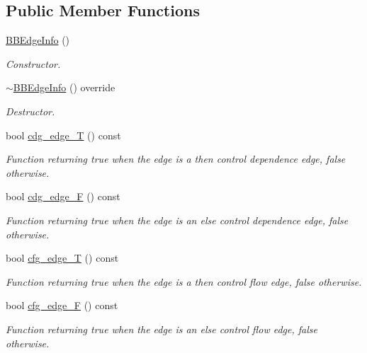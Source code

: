 \subsection*{Public Member Functions}
\begin{DoxyCompactItemize}
\item 
\hyperlink{structBBEdgeInfo_a61cfdd43ac244182cc6cfb2fa3417928}{B\+B\+Edge\+Info} ()
\begin{DoxyCompactList}\small\item\em Constructor. \end{DoxyCompactList}\item 
\hyperlink{structBBEdgeInfo_af00fe7eb7e1e14162b3d288dc97e3489}{$\sim$\+B\+B\+Edge\+Info} () override
\begin{DoxyCompactList}\small\item\em Destructor. \end{DoxyCompactList}\item 
bool \hyperlink{structBBEdgeInfo_a250632a2543325c808559a199b3552a9}{cdg\+\_\+edge\+\_\+T} () const
\begin{DoxyCompactList}\small\item\em Function returning true when the edge is a then control dependence edge, false otherwise. \end{DoxyCompactList}\item 
bool \hyperlink{structBBEdgeInfo_aa4a8bccec517f12229e14867314b2cf6}{cdg\+\_\+edge\+\_\+F} () const
\begin{DoxyCompactList}\small\item\em Function returning true when the edge is an else control dependence edge, false otherwise. \end{DoxyCompactList}\item 
bool \hyperlink{structBBEdgeInfo_ad703ec6c8aedbf0b9b09f9e9f61da4ce}{cfg\+\_\+edge\+\_\+T} () const
\begin{DoxyCompactList}\small\item\em Function returning true when the edge is a then control flow edge, false otherwise. \end{DoxyCompactList}\item 
bool \hyperlink{structBBEdgeInfo_a90a861e333cb2d342579b7a4449ee4fd}{cfg\+\_\+edge\+\_\+F} () const
\begin{DoxyCompactList}\small\item\em Function returning true when the edge is an else control flow edge, false otherwise. \end{DoxyCompactList}\item 

\end{DoxyCompactItemize}

